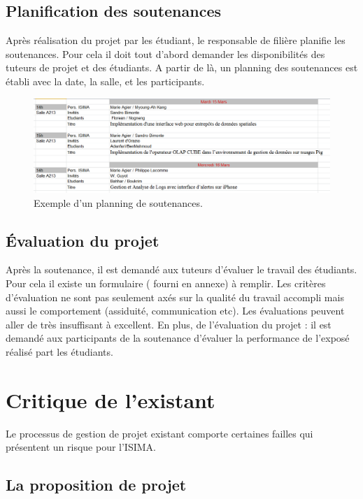 \documentclass[a4paper,11pt]{report}
\begin{document}
\subsection{Planification des soutenances}

\normalsize{
Après réalisation du projet par les étudiant, le responsable de filière planifie les soutenances. Pour cela il doit tout d'abord demander les disponibilités des tuteurs de projet et des étudiants. A partir de là, un planning des soutenances est établi avec la date, la salle, et les participants. 
}

\begin{figure}[h]
   \begin{center}
   \includegraphics[scale = 0.45]{CalendrierSoutenance.png}
   \end{center}
  \caption{Exemple d'un planning de soutenances.}
\end{figure}
 
\subsection{Évaluation du projet}

\normalsize{
Après la soutenance, il est demandé aux tuteurs d'évaluer le travail des étudiants. Pour cela il existe un formulaire ( fourni en annexe) à remplir. Les critères d'évaluation ne sont pas seulement axés sur la qualité du travail accompli mais aussi le comportement (assiduité, communication etc). Les évaluations peuvent aller de très insuffisant à excellent. En plus, de l'évaluation du projet : il est demandé aux participants de la soutenance d'évaluer la performance de l'exposé réalisé part les étudiants.
}
\section{Critique de l'existant}

\normalsize{
Le processus de gestion de projet existant comporte certaines failles qui présentent un risque pour l'ISIMA.
}

\subsection{La proposition de projet}
\end{document}
